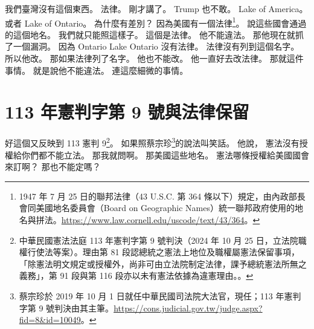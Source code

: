 \hypertarget{w01:cue:2080}{}我們臺灣沒有這個東西。
\hypertarget{w01:cue:2081}{}法律。
\hypertarget{w01:cue:2082}{}剛才講了。
\hypertarget{w01:cue:2083}{}Trump 也不敢。
\hypertarget{w01:cue:2084}{}Lake of America。
\hypertarget{w01:cue:2085}{}或者 Lake of Ontario。
\hypertarget{w01:cue:2086}{}為什麼有差別？
\hypertarget{w01:cue:2087}{}因為美國有一個法律\footnote{1947 年 7 月 25 日的聯邦法律（43 U.S.C. 第 364 條以下）規定，由內政部長會同美國地名委員會（Board on Geographic Names）統一聯邦政府使用的地名與拼法。\url{https://www.law.cornell.edu/uscode/text/43/364}。}。
\hypertarget{w01:cue:2088}{}說這些國會通過的這個地名。
\hypertarget{w01:cue:2089}{}我們就只能照這樣子。
\hypertarget{w01:cue:2090}{}這個是法律。
\hypertarget{w01:cue:2091}{}他不能違法。
\hypertarget{w01:cue:2092}{}那他現在就抓了一個漏洞。
\hypertarget{w01:cue:2093}{}因為 Ontario Lake Ontario 沒有法律。
\hypertarget{w01:cue:2094}{}法律沒有列到這個名字。
\hypertarget{w01:cue:2095}{}所以他改。
\hypertarget{w01:cue:2096}{}那如果法律列了名字。
\hypertarget{w01:cue:2097}{}他也不能改。
\hypertarget{w01:cue:2098}{}他一直好去改法律。
\hypertarget{w01:cue:2099}{}那就這件事情。
\hypertarget{w01:cue:2100}{}就是說他不能違法。
\hypertarget{w01:cue:2101}{}連這麼細微的事情。

\section{113 年憲判字第 9 號與法律保留}

\hypertarget{w01:cue:2102}{}好這個又反映到 113 憲判 9\footnote{中華民國憲法法庭 113 年憲判字第 9 號判決（2024 年 10 月 25 日，立法院職權行使法等案）。理由第 81 段認總統之憲法上地位及職權屬憲法保留事項，「除憲法明文規定或授權外，尚非可由立法院制定法律，課予總統憲法所無之義務」，第 91 段與第 116 段亦以未有憲法依據為違憲理由。\cite[理由第 81 段]{ccj113-9}。}。
\hypertarget{w01:cue:2103}{}如果照蔡宗珍\footnote{蔡宗珍於 2019 年 10 月 1 日就任中華民國司法院大法官，現任；113 年憲判字第 9 號判決由其主筆。\url{https://cons.judicial.gov.tw/judge.aspx?fid=8&id=10049}。}的說法叫笑話。
\hypertarget{w01:cue:2104}{}他說，
\hypertarget{w01:cue:2105}{}憲法沒有授權給你們都不能立法。
\hypertarget{w01:cue:2106}{}那我就問啊。
\hypertarget{w01:cue:2107}{}那美國這些地名。
\hypertarget{w01:cue:2108}{}憲法哪條授權給美國國會來訂啊？
\hypertarget{w01:cue:2109}{}那也不能定嗎？

